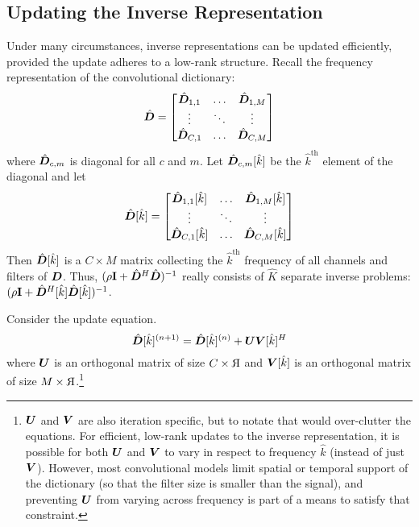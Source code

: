 \subsection{Updating the Inverse Representation}

Under many circumstances, inverse representations can be updated efficiently, provided the update adheres to a low-rank structure. Recall the frequency representation of the convolutional dictionary:
%
\begin{equation}
\hat{\bm{D}} = \begin{bmatrix}
\hat{\bm{D}}_{1,1} & \hdots & \hat{\bm{D}}_{1,M}\\
\vdots & \ddots & \vdots\\
\hat{\bm{D}}_{C,1} & \hdots & \hat{\bm{D}}_{C,M}
\end{bmatrix}
\end{equation}
%
where $\hat{\bm{D}}_{c,m}$ is diagonal for all $c$ and $m$. Let $\hat{\bm{D}}_{c,m}[\hat{k}]$ be the $\hat{k}^{\text{th}}$ element of the diagonal and let
%
\begin{equation}
\hat{\bm{D}}[\hat{k}] = \begin{bmatrix}
\hat{\bm{D}}_{1,1}[\hat{k}] & \hdots & \hat{\bm{D}}_{1,M}[\hat{k}]\\
\vdots & \ddots & \vdots\\
\hat{\bm{D}}_{C,1}[\hat{k}] & \hdots & \hat{\bm{D}}_{C,M}[\hat{k}]
\end{bmatrix}
\end{equation}
%
Then $\hat{\bm{D}}[\hat{k}]$ is a $C \times M$ matrix collecting the $\hat{k}^{\text{th}}$ frequency of all channels and filters of $\bm{D}$. Thus, $(\rho{\bf I} + \hat{\bm{D}}^H\hat{\bm{D}})^{-1}$ really consists of $\hat{K}$ separate inverse problems: $(\rho{\bf I} + \hat{\bm{D}}^H[\hat{k}]\hat{\bm{D}}[\hat{k}])^{-1}$.

Consider the update equation.
%
\begin{equation}
\hat{\bm{D}}[\hat{k}]^{(n + 1)} = \hat{\bm{D}}[\hat{k}]^{(n)} + \bm{U}\bm{V}[\hat{k}]^H
\end{equation}
%
where $\bm{U}$ is an orthogonal matrix of size $C \times 
\reflectbox{R}$ and $\bm{V}[\hat{k}]$ is an orthogonal matrix of size $M \times 
\reflectbox{R}$.\footnote{$\bm{U}$ and $\bm{V}$ are also iteration specific, but to notate that would over-clutter the equations. For efficient, low-rank updates to the inverse representation, it is possible for both $\bm{U}$ and $\bm{V}$ to vary in respect to frequency $\hat{k}$ (instead of just $\bm{V}$). However, most convolutional models limit spatial or temporal support of the dictionary (so that the filter size is smaller than the signal), and preventing $\bm{U}$ from varying across frequency is part of a means to satisfy that constraint.}

